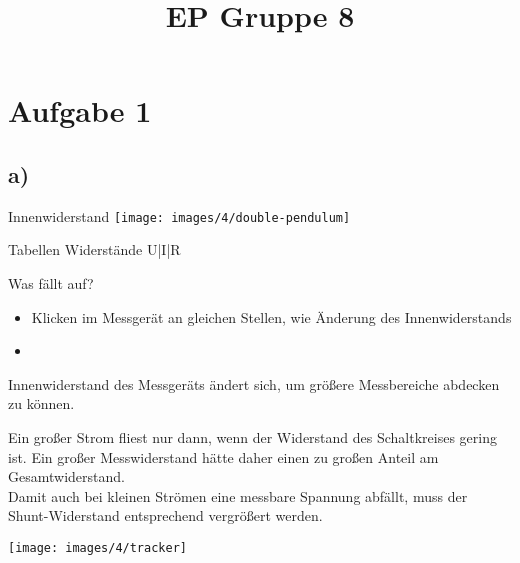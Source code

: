 \documentclass[compress,11pt]{beamer}
\title{EP Gruppe 8}
\begin{document}
\frame[c]{\titlepage}
\begin{frame}
\tableofcontents
\end{frame}

\section{Aufgabe 1}
\subsection{a)}
\begin{frame}{Innenwiderstand}
\centering
\texttt{[image: images/4/double-pendulum]}%
\end{frame}

\begin{frame}
Tabellen Widerstände U|I|R
\end{frame}

\begin{frame}
\end{frame}


\begin{frame}
\begin{block}{Was fällt auf?}
\begin{itemize}
\item Klicken im Messgerät an gleichen Stellen, wie Änderung des Innenwiderstands
\item 
\end{itemize}
Innenwiderstand des Messgeräts ändert sich, um größere Messbereiche abdecken zu können.
\end{block}
\end{frame}


\begin{frame}
Ein großer Strom fliest nur dann, wenn der Widerstand des Schaltkreises gering ist. Ein großer Messwiderstand hätte daher einen zu großen Anteil am Gesamtwiderstand.\\
Damit auch bei kleinen Strömen eine messbare Spannung abfällt, muss der Shunt-Widerstand entsprechend vergrößert werden.
\end{frame}


\begin{frame}
\end{frame}

\begin{frame}
\texttt{[image: images/4/tracker]}
\end{frame}
\end{document}
